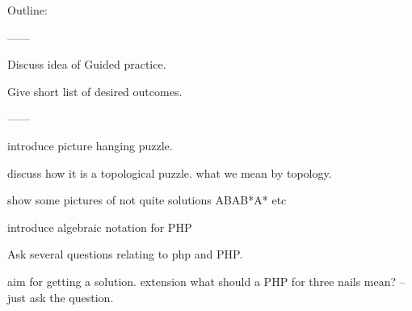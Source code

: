 \documentclass[12pt,letterpaper]{article}
\begin{document}
\setlength{\parskip}{1ex plus 0.5ex minus 0.2ex}
\setlength{\parindent}{0pt}

\pagestyle{fancy}
\cfoot{} 


Outline:

------

Discuss idea of Guided practice.

Give short list of desired outcomes.

------

introduce picture hanging puzzle.

discuss how it is a topological puzzle. what we mean by topology.

show some pictures of not quite solutions ABAB*A* etc

introduce algebraic notation for PHP

Ask several questions relating to php and PHP.

aim for getting a solution. extension what should a PHP for three nails mean? --just ask the question.
\end{document}
